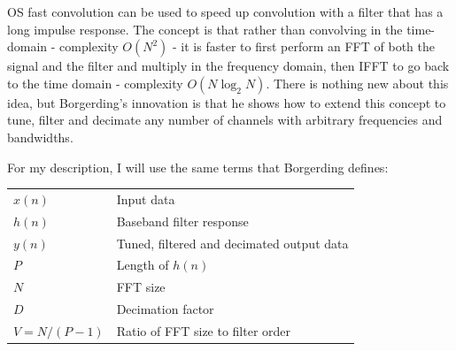 \documentclass[12pt]{report}
\begin{document}
OS fast convolution can be used to speed up convolution with
a filter that has a long impulse response. The concept is that rather than
convolving in the time-domain - complexity $O(N^2)$ - it is faster to first
perform an FFT of both the signal and the filter and multiply in the frequency
domain, then IFFT to go back to the time domain - complexity $O(N\log_2N)$.
There is nothing new about this idea, but Borgerding's innovation is that he
shows how to extend this concept to tune, filter and decimate any number of
channels with arbitrary frequencies and bandwidths.

For my description, I will use the same terms that Borgerding defines:

\begin{tabular}{ll}
    $x(n)$        & Input data \\
    $h(n)$        & Baseband filter response \\
    $y(n)$        & Tuned, filtered and decimated output data \\
    $P$           & Length of $h(n)$ \\
    $N$           & FFT size \\
    $D$           & Decimation factor \\
    $V = N/(P-1)$ & Ratio of FFT size to filter order \\
\end{tabular}
\end{document}
